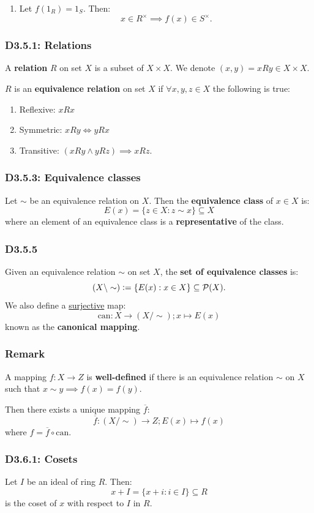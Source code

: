 \documentclass{article}
\newcommand{\deq}{\vcentcolon=}
\begin{document}
\begin{multicols*}{3}
\begin{enumerate}
    \item Let $f(1_R)=1_S$. Then:
    $$x\in R^{\times}\implies f(x)\in S^{\times}.$$
\end{enumerate}

\subsubsection*{D3.5.1: Relations}
A \textbf{relation} $R$ on set $X$ is a subset of $X\times X$.
We denote $(x,y)=xRy\in X\times X$.

$R$ is an \textbf{equivalence relation} on set $X$
if $\forall x,y,z\in X$ the following is true:
\begin{enumerate}
    \item Reflexive: $xRx$
    \item Symmetric: $xRy\iff yRx$
    \item Transitive: $(xRy\land yRz)\implies xRz$.
\end{enumerate}

\subsubsection*{D3.5.3: Equivalence classes}
Let $\sim$ be an equivalence relation on $X$.
Then the \textbf{equivalence class} of $x\in X$ is:
$$E(x)=\{z\in X:z\sim x\}\subseteq X$$
where an element of an equivalence class is 
a \textbf{representative} of the class.

\subsubsection*{D3.5.5}
Given an equivalence relation $\sim$ on set $X$,
the \textbf{set of equivalence classes} is:
$$(X\backslash\sim)\deq\{E(x):x\in X\}
\subseteq\mathcal{P}(X).$$
We also define a \underline{surjective} map:
$$\text{can}:X\rightarrow(X/\sim);x\mapsto E(x)$$
known as the \textbf{canonical mapping}.

\subsubsection*{Remark}
A mapping $f:X\rightarrow Z$ is \textbf{well-defined} if
there is an equivalence relation $\sim$ on $X$ such that
$x\sim y\implies f(x)=f(y)$. 

Then there exists a unique mapping $\overline{f}$:
$$\overline{f}:(X/\sim)\rightarrow Z;
E(x)\mapsto f(x)$$
where $f=\overline{f}\circ\text{can}$.

\subsubsection*{D3.6.1: Cosets}
Let $I$ be an ideal of ring $R$. Then:
$$x+I=\{x+i:i\in I\}\subseteq R$$
is the coset of $x$ with respect to $I$ in $R$.


\end{multicols*}
\end{document}
